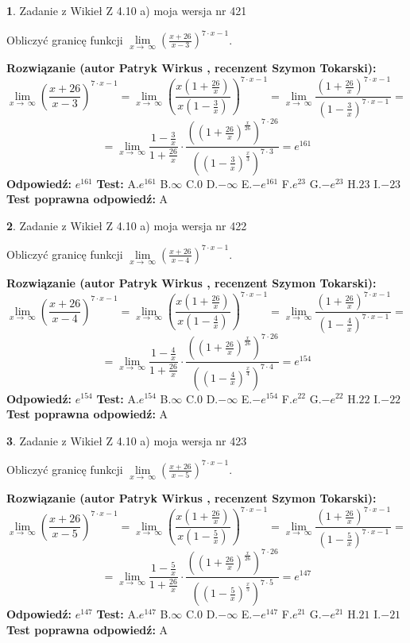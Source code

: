 \documentclass[12pt, a4paper]{article}
\theoremstyle{definition} %
\newtheorem{zad}{}
\newcommand{\zadStart}[1]{\begin{zad}#1\newline}
\newcommand{\zadStop}{\end{zad}}
\newcommand{\rozwStart}[2]{\noindent \textbf{Rozwiązanie (autor #1 , recenzent #2): }\newline}
\newcommand{\rozwStop}{\newline}
\newcommand{\odpStart}{\noindent \textbf{Odpowiedź:}\newline}
\newcommand{\odpStop}{\newline}
\newcommand{\testStart}{\noindent \textbf{Test:}\newline}
\newcommand{\testStop}{\newline}
\newcommand{\kluczStart}{\noindent \textbf{Test poprawna odpowiedź:}\newline}
\newcommand{\kluczStop}{\newline}
\begin{document}
\zadStart{Zadanie z Wikieł Z 4.10 a) moja wersja nr 421}

Obliczyć granicę funkcji  $\lim\limits_{x\to\ \infty}(\frac{x+26}{x-3})^{7\cdot x-1}$.
\zadStop
\rozwStart{Patryk Wirkus}{Szymon Tokarski}
$$\lim\limits_{x\to\ \infty}(\frac{x+26}{x-3})^{7\cdot x-1} = \lim\limits_{x\to\ \infty}(\frac{x(1+\frac{26}{x})}{x(1-\frac{3}{x})})^{7\cdot x-1}=\lim\limits_{x\to\ \infty}\frac{(1+\frac{26}{x})^{7\cdot x-1}}{(1-\frac{3}{x})^{7\cdot x-1}}=$$
$$=\lim\limits_{x\to\ \infty}\frac{1-\frac{3}{x}}{1+\frac{26}{x}}\cdot\frac{((1+\frac{26}{x})^{\frac{x}{26}})^{7\cdot26}}{((1-\frac{3}{x})^{\frac{x}{3}})^{7\cdot3}}=e^{161}$$
\rozwStop
\odpStart
$e^{161}$
\odpStop
\testStart
A.$e^{161}$ B.$\infty$ C.$0$ D.$-\infty$ E.$-e^{161}$
F.$e^{23}$ G.$-e^{23}$
H.$23$
I.$-23$
\testStop
\kluczStart
A
\kluczStop



\zadStart{Zadanie z Wikieł Z 4.10 a) moja wersja nr 422}

Obliczyć granicę funkcji  $\lim\limits_{x\to\ \infty}(\frac{x+26}{x-4})^{7\cdot x-1}$.
\zadStop
\rozwStart{Patryk Wirkus}{Szymon Tokarski}
$$\lim\limits_{x\to\ \infty}(\frac{x+26}{x-4})^{7\cdot x-1} = \lim\limits_{x\to\ \infty}(\frac{x(1+\frac{26}{x})}{x(1-\frac{4}{x})})^{7\cdot x-1}=\lim\limits_{x\to\ \infty}\frac{(1+\frac{26}{x})^{7\cdot x-1}}{(1-\frac{4}{x})^{7\cdot x-1}}=$$
$$=\lim\limits_{x\to\ \infty}\frac{1-\frac{4}{x}}{1+\frac{26}{x}}\cdot\frac{((1+\frac{26}{x})^{\frac{x}{26}})^{7\cdot26}}{((1-\frac{4}{x})^{\frac{x}{4}})^{7\cdot4}}=e^{154}$$
\rozwStop
\odpStart
$e^{154}$
\odpStop
\testStart
A.$e^{154}$ B.$\infty$ C.$0$ D.$-\infty$ E.$-e^{154}$
F.$e^{22}$ G.$-e^{22}$
H.$22$
I.$-22$
\testStop
\kluczStart
A
\kluczStop



\zadStart{Zadanie z Wikieł Z 4.10 a) moja wersja nr 423}

Obliczyć granicę funkcji  $\lim\limits_{x\to\ \infty}(\frac{x+26}{x-5})^{7\cdot x-1}$.
\zadStop
\rozwStart{Patryk Wirkus}{Szymon Tokarski}
$$\lim\limits_{x\to\ \infty}(\frac{x+26}{x-5})^{7\cdot x-1} = \lim\limits_{x\to\ \infty}(\frac{x(1+\frac{26}{x})}{x(1-\frac{5}{x})})^{7\cdot x-1}=\lim\limits_{x\to\ \infty}\frac{(1+\frac{26}{x})^{7\cdot x-1}}{(1-\frac{5}{x})^{7\cdot x-1}}=$$
$$=\lim\limits_{x\to\ \infty}\frac{1-\frac{5}{x}}{1+\frac{26}{x}}\cdot\frac{((1+\frac{26}{x})^{\frac{x}{26}})^{7\cdot26}}{((1-\frac{5}{x})^{\frac{x}{5}})^{7\cdot5}}=e^{147}$$
\rozwStop
\odpStart
$e^{147}$
\odpStop
\testStart
A.$e^{147}$ B.$\infty$ C.$0$ D.$-\infty$ E.$-e^{147}$
F.$e^{21}$ G.$-e^{21}$
H.$21$
I.$-21$
\testStop
\kluczStart
A
\kluczStop
\end{document}
